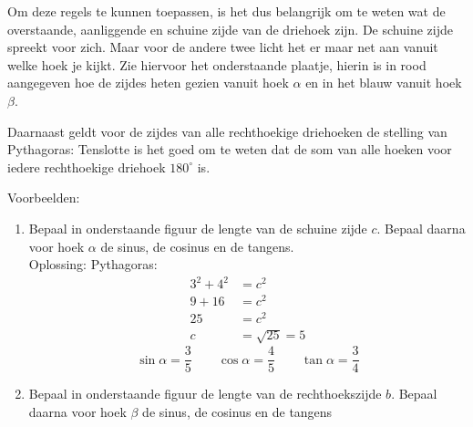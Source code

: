 Om deze regels te kunnen toepassen, is het dus belangrijk om te weten wat de overstaande, aanliggende en schuine zijde van de driehoek zijn. De schuine zijde spreekt voor zich. Maar voor de andere twee licht het er maar net aan vanuit welke hoek je kijkt. Zie hiervoor het onderstaande plaatje, hierin is in rood aangegeven hoe de zijdes heten gezien vanuit hoek $\alpha$ en in het blauw vanuit hoek $\beta$.
{
\begin{center}
\end{center}
}
Daarnaast geldt voor de zijdes van alle rechthoekige driehoeken de stelling van Pythagoras:
Tenslotte is het goed om te weten dat de som van alle hoeken voor iedere rechthoekige driehoek $180^{\circ}$ is.

Voorbeelden:
\begin{enumerate}
    \item Bepaal in onderstaande figuur de lengte van de schuine zijde $c$. Bepaal daarna voor hoek $\alpha$ de sinus, de cosinus en de tangens. \\

    Oplossing: Pythagoras: 
    \begin{align*}
        3^2+4^2&=c^2 \\
        9+16&=c^2 \\
        25&=c^2 \\
        c&=\sqrt{25} = 5
    \end{align*}
    \[
        \sin \alpha = \frac{3}{5} \qquad \cos \alpha = \frac{4}{5} \qquad \tan \alpha = \frac{3}{4}
    \]

    \item Bepaal in onderstaande figuur de lengte van de rechthoekszijde $b$. Bepaal daarna voor hoek $\beta$ de sinus, de cosinus en de tangens
\end{enumerate}


